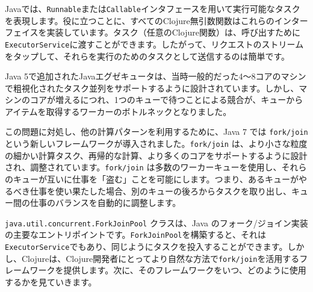 Javaでは、\texttt{Runnable}または\texttt{Callable}インタフェースを用いて実行可能なタスクを表現します。役に立つことに、すべてのClojure無引数関数はこれらのインターフェイスを実装しています。タスク（任意のClojure関数）は、呼び出すために\texttt{ExecutorService}に渡すことができます。したがって、リクエストのストリームをタップして、それらを実行のためのタスクとして送信するのは簡単です。

Java 5で追加されたJavaエグゼキュータは、当時一般的だった4～8コアのマシンで粗視化されたタスク並列をサポートするように設計されています。しかし、マシンのコアが増えるにつれ、1つのキューで待つことによる競合が、キューからアイテムを取得するワーカーのボトルネックとなりました。

この問題に対処し、他の計算パターンを利用するために、Java 7 では \texttt{fork/join} という新しいフレームワークが導入されました。\texttt{fork/join} は、より小さな粒度の細かい計算タスク、再帰的な計算、より多くのコアをサポートするように設計され、調整されています。\texttt{fork/join} は多数のワーカーキューを使用し、それらのキューが互いに仕事を「盗む」ことを可能にします。つまり、あるキューがやるべき仕事を使い果たした場合、別のキューの後ろからタスクを取り出し、キュー間の仕事のバランスを自動的に調整します。

\texttt{java.util.concurrent.ForkJoinPool} クラスは、Java のフォーク/ジョイン実装の主要なエントリポイントです。\texttt{ForkJoinPool}を構築すると、それは\texttt{ExecutorService}でもあり、同じようにタスクを投入することができます。しかし、Clojureは、Clojure開発者にとってより自然な方法で\texttt{fork/join}を活用するフレームワークを提供します。次に、そのフレームワークをいつ、どのように使用するかを見ていきます。